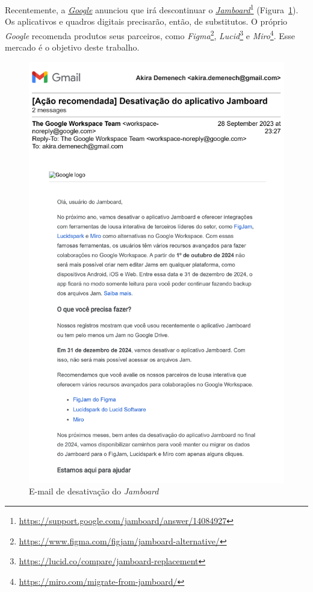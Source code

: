 \documentclass[twocolumn,12pt]{article}
\title{\brand{Jellypanel}}
\author{Guilherme Akira Demenech Mori}
\newcommand{\brand}[1]{\textit{#1}}
\begin{document}
	
	\maketitle
	
	\begin{abstract}
	
	\end{abstract}

	\tableofcontents
	\listoffigures
	
	Recentemente, a \href{https://www.google.com.br/}{\brand{Google}} anunciou que irá descontinuar o \href{https://jamboard.google.com/}{\brand{Jamboard}}\footnote{\url{https://support.google.com/jamboard/answer/14084927}} (Figura~\ref{fig:gmail}). 
	Os aplicativos e quadros digitais precisarão, então, de substitutos.
	O próprio \brand{Google} recomenda produtos seus parceiros, como  \brand{Figma}\footnote{\url{https://www.figma.com/figjam/jamboard-alternative/}}, \brand{Lucid}\footnote{\url{https://lucid.co/compare/jamboard-replacement}} e \brand{Miro}\footnote{\url{https://miro.com/migrate-from-jamboard/}}.   				
	Esse mercado é o objetivo deste trabalho. 
	
	\begin{figure}[htpb]
		\caption{E-mail de desativação do \brand{Jamboard}}
		\label{fig:gmail}
		\includegraphics[width=\linewidth]{jamboard.pdf}
	\end{figure}

	
	
	\lipsum[1-10]
\end{document}
